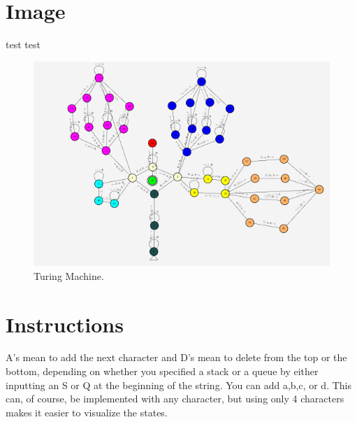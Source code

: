 \documentclass{article}
\begin{document}
\section{Image}
test test
\begin{figure}
    \includegraphics[width=\linewidth]{stackqueue.png}
    \caption{Turing Machine.}
    \label{fig:stackqueue}
\end{figure}

\section{Instructions}
A's mean to add the next character and D's mean to delete from the top or the bottom, depending on whether you specified a stack or a queue
by either inputting an S or Q at the beginning of the string. 
You can add a,b,c, or d. This can, of course, be implemented with any character,
but using only 4 characters makes it easier to visualize the states.
\end{document}
